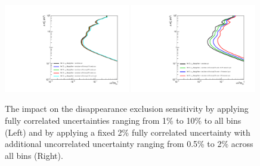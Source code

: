 \begin{figure}[!h]
    \centering
    \includegraphics[width = 0.49\textwidth]{figures-chap6/exclusion_contours/efficiency_systematics/numu_disapp_Xpct_cor.pdf}
    \includegraphics[width = 0.49\textwidth]{figures-chap6/exclusion_contours/efficiency_systematics/numu_disapp_2pct_cor_Xpct_uncor.pdf}
    \caption[Impact of correlated and uncorrelated efficiency systematics on the \numu disappearance channel.]{The impact on the \numu disappearance exclusion sensitivity by applying fully correlated uncertainties ranging from 1\% to 10\% to all bins (Left) and by applying a fixed 2\% fully correlated uncertainty with additional uncorrelated uncertainty ranging from 0.5\% to 2\% across all bins (Right). }
    \label{fig:numu_corr_uncorr_error}
\end{figure}

